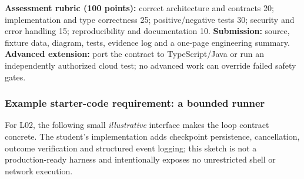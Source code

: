 \documentclass[
  10pt,
]{article}
\begin{document}
\textbf{Assessment rubric (100 points):} correct architecture and
contracts 20; implementation and type correctness 25; positive/negative
tests 30; security and error handling 15; reproducibility and
documentation 10. \textbf{Submission:} source, fixture data, diagram,
tests, evidence log and a one-page engineering summary. \textbf{Advanced
extension:} port the contract to TypeScript/Java or run an independently
authorized cloud test; no advanced work can override failed safety
gates.

\subsubsection{Example starter-code requirement: a bounded
runner}\label{example-starter-code-requirement-a-bounded-runner}

For L02, the following small \emph{illustrative} interface makes the
loop contract concrete. The student's implementation adds checkpoint
persistence, cancellation, outcome verification and structured event
logging; this sketch is not a production-ready harness and intentionally
exposes no unrestricted shell or network execution.
\end{document}

